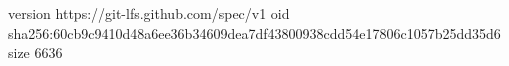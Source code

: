 version https://git-lfs.github.com/spec/v1
oid sha256:60cb9c9410d48a6ee36b34609dea7df43800938cdd54e17806c1057b25dd35d6
size 6636
